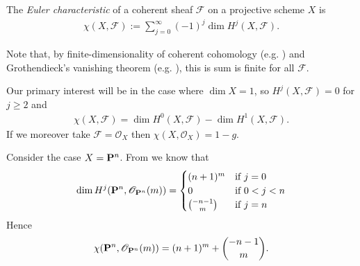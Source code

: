 \documentclass[12pt]{ociamthesis}  %
\begin{document}
\begin{definition}
  The \emph{Euler characteristic} of a coherent sheaf $\mathscr F$
  on a projective scheme $X$ is
  \begin{align*}
    \chi (X,\mathscr F) := \sum_{j=0}^\infty (-1)^j \dim H^j (X,\mathscr F).
  \end{align*}
\end{definition}

Note that, by finite-dimensionality of coherent cohomology
(e.g. \cite[\href{https://stacks.math.columbia.edu/tag/02O6}{Tag 02O6}]{stacks-project}) and Grothendieck's vanishing theorem (e.g.
\cite[III Theorem 2.7]{hartshorne1977}), this is sum is finite for
all $\mathscr F$.

\begin{example}
  Our primary interest will be in the case where
  $\dim X = 1$, so $H^j(X,\mathscr F)=0$ for $j\geq 2$ and
  \begin{align*}
    \chi (X,\mathscr F) = \dim H^0(X,\mathscr F)-\dim H^1(X,\mathscr F).
  \end{align*}
  If we moreover take $\mathscr F=\mathscr O_X$ then
  $\chi (X,\mathscr O_X) = 1 - g$. 
\end{example}

\begin{example}
  Consider the case $X=\mathbf{P}^{n}_{}$.
  From \missingcitation we know that
  \begin{align*}
    \dim H^j(\mathbf{P}^{n}_{},\mathscr O_{\mathbf{P}^{n}_{}}(m)) =
    \begin{cases}
      (n+1)^m         & \text{if }j = 0 \\
      0               & \text{if }0<j<n \\
      \binom{-n-1}{m} & \text{if }j=n
    \end{cases}
  \end{align*}
  Hence 
  \begin{align*}
    \chi(\mathbf{P}^{n}_{},\mathscr O_{\mathbf{P}^{n}_{}}(m))
    = (n+1)^m + \binom{-n-1}{m}.
  \end{align*}
\end{example}

\begin{lemma}
\end{lemma}

\begin{lemma}\label{lem:hilbert_base_change}
\end{lemma}
\end{document}

